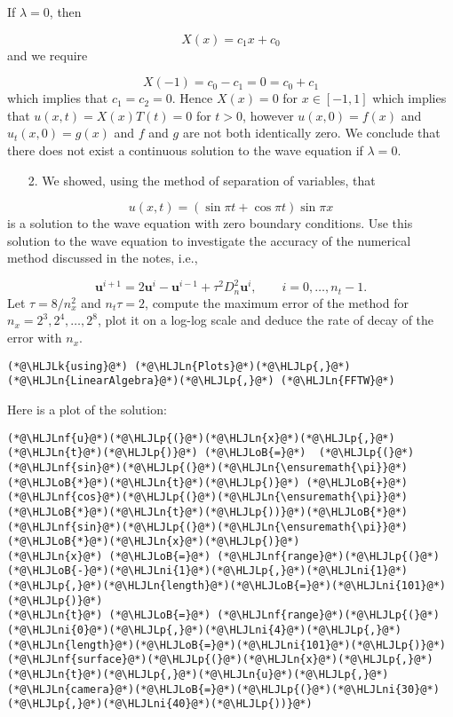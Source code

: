 \documentclass[12pt,a4paper]{article}
\newcommand{\HLJLk}[1]{\textcolor[RGB]{148,91,176}{\textbf{#1}}}
\newcommand{\HLJLn}[1]{#1}
\newcommand{\HLJLnf}[1]{\textcolor[RGB]{66,102,213}{#1}}
\newcommand{\HLJLni}[1]{\textcolor[RGB]{59,151,46}{#1}}
\newcommand{\HLJLoB}[1]{\textcolor[RGB]{102,102,102}{\textbf{#1}}}
\newcommand{\HLJLp}[1]{#1}
\begin{document}
If $\lambda = 0$, then

\[
X(x) = c_1x + c_0
\]
and we require 

\[
X(-1) = c_0 - c_1 = 0 = c_0 + c_1
\]
which implies that $c_1 = c_2 = 0$.   Hence $X(x) = 0$ for $x \in [-1, 1]$ which implies that $u(x,t) = X(x)T(t) = 0$ for $t > 0$, however $u(x,0) = f(x)$ and $u_t(x,0) = g(x)$ and $f$ and $g$ are not both identically zero.   We conclude that there does not exist a continuous solution to the wave equation if $\lambda = 0$.

\begin{itemize}
\item[2. ] We showed, using the method of separation of variables, that 

\end{itemize}
\[
     u(x,t) =  \left( \sin\pi t + \cos\pi t  \right)\sin \pi x
\]
is a solution to the wave equation with zero boundary conditions.  Use this solution to the wave equation to investigate the accuracy of the  numerical method discussed in the notes, i.e., 

\[
   \mathbf{u}^{i+1} = 2\mathbf{u}^{i} - \mathbf{u}^{i-1} + \tau^2 D_n^2\mathbf{u}^{i}, \qquad i = 0, \ldots, n_t-1.
\]
Let $\tau = 8/n_x^2$ and $n_t \tau = 2$, compute the maximum error of the method for $n_x = 2^3, 2^4, \ldots, 2^8$, plot it on a log-log scale and deduce the rate of decay of the error with $n_x$.


\begin{lstlisting}
(*@\HLJLk{using}@*) (*@\HLJLn{Plots}@*)(*@\HLJLp{,}@*) (*@\HLJLn{LinearAlgebra}@*)(*@\HLJLp{,}@*) (*@\HLJLn{FFTW}@*)
\end{lstlisting}


Here is a plot of the solution:


\begin{lstlisting}
(*@\HLJLnf{u}@*)(*@\HLJLp{(}@*)(*@\HLJLn{x}@*)(*@\HLJLp{,}@*)(*@\HLJLn{t}@*)(*@\HLJLp{)}@*) (*@\HLJLoB{=}@*)  (*@\HLJLp{(}@*)(*@\HLJLnf{sin}@*)(*@\HLJLp{(}@*)(*@\HLJLn{\ensuremath{\pi}}@*)(*@\HLJLoB{*}@*)(*@\HLJLn{t}@*)(*@\HLJLp{)}@*) (*@\HLJLoB{+}@*) (*@\HLJLnf{cos}@*)(*@\HLJLp{(}@*)(*@\HLJLn{\ensuremath{\pi}}@*)(*@\HLJLoB{*}@*)(*@\HLJLn{t}@*)(*@\HLJLp{))}@*)(*@\HLJLoB{*}@*)(*@\HLJLnf{sin}@*)(*@\HLJLp{(}@*)(*@\HLJLn{\ensuremath{\pi}}@*)(*@\HLJLoB{*}@*)(*@\HLJLn{x}@*)(*@\HLJLp{)}@*)
(*@\HLJLn{x}@*) (*@\HLJLoB{=}@*) (*@\HLJLnf{range}@*)(*@\HLJLp{(}@*)(*@\HLJLoB{-}@*)(*@\HLJLni{1}@*)(*@\HLJLp{,}@*)(*@\HLJLni{1}@*)(*@\HLJLp{,}@*)(*@\HLJLn{length}@*)(*@\HLJLoB{=}@*)(*@\HLJLni{101}@*)(*@\HLJLp{)}@*)
(*@\HLJLn{t}@*) (*@\HLJLoB{=}@*) (*@\HLJLnf{range}@*)(*@\HLJLp{(}@*)(*@\HLJLni{0}@*)(*@\HLJLp{,}@*)(*@\HLJLni{4}@*)(*@\HLJLp{,}@*)(*@\HLJLn{length}@*)(*@\HLJLoB{=}@*)(*@\HLJLni{101}@*)(*@\HLJLp{)}@*)
(*@\HLJLnf{surface}@*)(*@\HLJLp{(}@*)(*@\HLJLn{x}@*)(*@\HLJLp{,}@*)(*@\HLJLn{t}@*)(*@\HLJLp{,}@*)(*@\HLJLn{u}@*)(*@\HLJLp{,}@*) (*@\HLJLn{camera}@*)(*@\HLJLoB{=}@*)(*@\HLJLp{(}@*)(*@\HLJLni{30}@*)(*@\HLJLp{,}@*)(*@\HLJLni{40}@*)(*@\HLJLp{))}@*)
\end{lstlisting}
\end{document}
